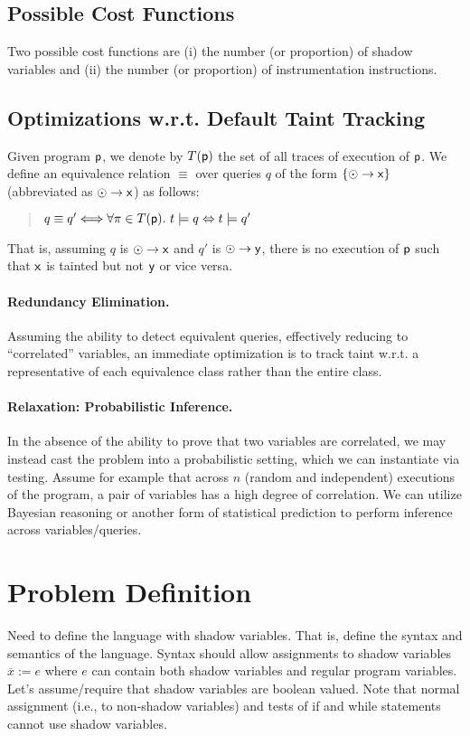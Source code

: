 \documentclass[]{article}
\begin{document}
\subsection{Possible Cost Functions}

Two possible cost functions are (i) the number (or proportion) of shadow variables and (ii) the number (or proportion) of instrumentation instructions.

\subsection{Optimizations w.r.t. Default Taint Tracking} 

Given program ${\sf p}$, we denote by $T({\sf p})$ the set of all traces of execution of ${\sf p}$. We define an equivalence relation $\equiv$ over queries $q$ of the form $\{ \odot \rightarrow {\sf x} \}$ (abbreviated as $\odot \rightarrow {\sf x}$) as follows:
\begin{quote}
$q \equiv q'
\Longleftrightarrow \forall \pi \in T({\sf p}).\ t \models q \Leftrightarrow t \models q'$
\end{quote}
That is, assuming $q$ is $\odot \rightarrow {\sf x}$ and $q'$
is $\odot \rightarrow {\sf y}$, there is no execution of ${\sf p}$ such that ${\sf x}$ is tainted but not ${\sf y}$ or vice versa.
 
\paragraph{Redundancy Elimination.} Assuming the ability to detect equivalent queries, effectively reducing to ``correlated'' variables, an immediate optimization is to track taint w.r.t. a representative of each equivalence class rather than the entire class.

\paragraph{Relaxation: Probabilistic Inference.} In the absence of the ability to prove that two variables are correlated, we may instead cast the problem into a probabilistic setting, which we can instantiate via testing. Assume for example that across $n$ (random and independent) executions of the program, a pair of variables has a high degree of correlation. We can utilize Bayesian reasoning or another form of statistical prediction to perform inference across variables/queries.

\section{Problem Definition}
Need to define the language with shadow variables. That is,
  define the syntax and semantics of the language. Syntax should allow
assignments to shadow variables $\overline{x} := e$ where $e$ can
contain both shadow variables and regular program variables. Let's
assume/require that shadow variables are boolean valued. Note that
normal assignment (i.e., to non-shadow variables) and tests of if and
while statements cannot use shadow variables.
\end{document}
